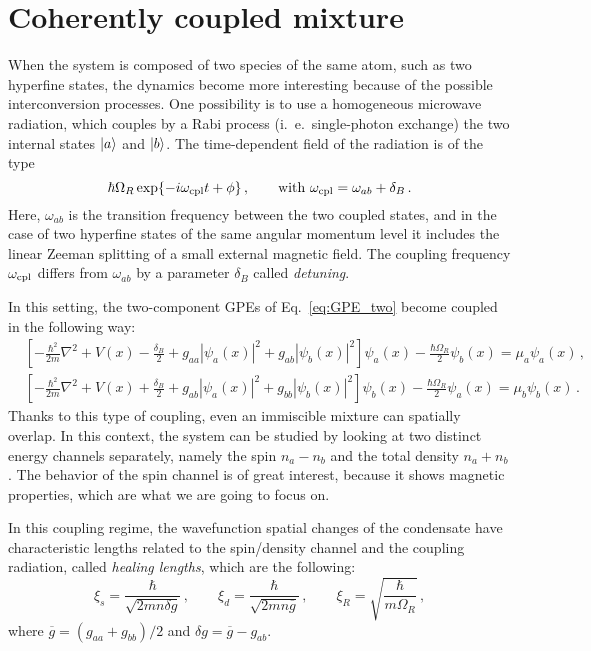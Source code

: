 \section{Coherently coupled mixture}
When the system is composed of two species of the same atom, such as two hyperfine states, the dynamics become more interesting because of the possible interconversion processes. One possibility is to use a homogeneous microwave radiation, which couples by a Rabi process (i.\ e.\ single-photon exchange) the two internal states $\ket{a}$ and $\ket{b}$. The time-dependent field of the radiation is of the type
\begin{equation*}
    \hbar\Omega_R \exp{-i\omega_{\rm cpl}t + \phi}\, ,\qquad \text{with }
    \omega_{\rm cpl} = \omega_{ab} + \delta_B\, .
\end{equation*}
Here, $\omega_{ab}$ is the transition frequency between the two coupled states, and in the case of two hyperfine states of the same angular momentum level it includes the linear Zeeman splitting of a small external magnetic field. The coupling frequency $\omega_{\rm cpl}$ differs from $\omega_{ab}$ by a parameter $\delta_B$ called \emph{detuning}.

In this setting, the two-component GPEs of Eq.\ \eqref{eq:GPE_two} become coupled in the following way:
\begin{equation}
    \begin{aligned}
        &\left[ -\frac{\hbar^2}{2m}\nabla^2 + V(x) - \frac{\delta_B}{2} + g_{aa}|\psi_a(x)|^2 + g_{ab}|\psi_b(x)|^2
        \right] \psi_a(x) - \frac{\hbar\Omega_R}{2}\psi_b(x) = \mu_a \psi_a(x)\, , \\
        &\left[ -\frac{\hbar^2}{2m}\nabla^2 + V(x) + \frac{\delta_B}{2} + g_{ab}|\psi_a(x)|^2 + g_{bb}|\psi_b(x)|^2
        \right] \psi_b(x) - \frac{\hbar\Omega_R}{2}\psi_a(x) = \mu_b \psi_b(x)\, .
    \end{aligned}
    \label{eq:GPE_coupled}
\end{equation}
Thanks to this type of coupling, even an immiscible mixture can spatially overlap. In this context, the system can be studied by looking at two distinct energy channels separately, namely the spin $n_a-n_b$ and the total density $n_a+n_b$. The behavior of the spin channel is of great interest, because it shows magnetic properties, which are what we are going to focus on. 

In this coupling regime, the wavefunction spatial changes of the condensate have characteristic lengths related to the spin/density channel and the coupling radiation, called \emph{healing lengths}, which are the following:
\begin{equation}
    \xi_s = \frac{\hbar}{\sqrt{2mn\delta g}}\, ,
    \qquad
    \xi_d = \frac{\hbar}{\sqrt{2mn\overline{g}}}\, ,
    \qquad
    \xi_R = \sqrt{\frac{\hbar}{m\Omega_R}}\, ,
    \label{eq:heal}
\end{equation} 
where $\overline{g} = (g_{aa}+g_{bb})/2$ and $\delta g = \overline{g} - g_{ab}$.

